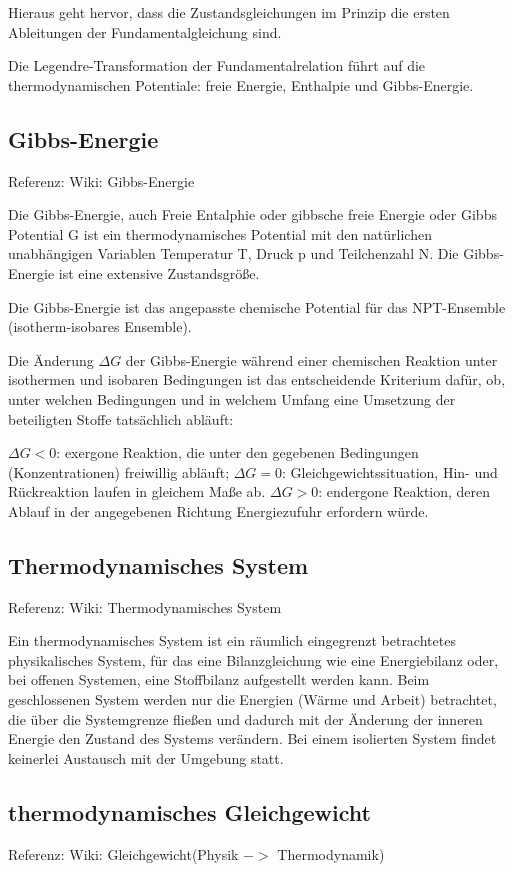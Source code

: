 \documentclass[]{article}
\begin{document}
Hieraus geht hervor, dass die Zustandsgleichungen im Prinzip die ersten Ableitungen der Fundamentalgleichung sind.

Die Legendre-Transformation der Fundamentalrelation führt auf die thermodynamischen Potentiale: freie Energie, Enthalpie und Gibbs-Energie.

\subsection{Gibbs-Energie}
Referenz: Wiki: Gibbs-Energie

Die Gibbs-Energie, auch Freie Entalphie oder gibbsche freie Energie oder Gibbs Potential G ist ein thermodynamisches Potential mit den natürlichen unabhängigen Variablen Temperatur T, Druck p und Teilchenzahl N.  Die Gibbs-Energie ist eine extensive Zustandsgröße.

Die Gibbs-Energie ist das angepasste chemische Potential für das NPT-Ensemble (isotherm-isobares Ensemble).

Die Änderung $\Delta G$ der Gibbs-Energie während einer chemischen Reaktion unter isothermen und isobaren Bedingungen ist das entscheidende Kriterium dafür, ob, unter welchen Bedingungen und in welchem Umfang eine Umsetzung der beteiligten Stoffe tatsächlich abläuft:

    $\Delta G<0$: exergone Reaktion, die unter den gegebenen Bedingungen (Konzentrationen) freiwillig abläuft;
    $\Delta G=0$: Gleichgewichtssituation, Hin- und Rückreaktion laufen in gleichem Maße ab.
    $\Delta G>0$: endergone Reaktion, deren Ablauf in der angegebenen Richtung Energiezufuhr erfordern würde.


\subsection{Thermodynamisches System}
Referenz: Wiki: Thermodynamisches System

Ein thermodynamisches System ist ein räumlich eingegrenzt betrachtetes physikalisches System, für das eine Bilanzgleichung wie eine Energiebilanz oder, bei offenen Systemen, eine Stoffbilanz aufgestellt werden kann. Beim geschlossenen System werden nur die Energien (Wärme und Arbeit) betrachtet, die über die Systemgrenze fließen und dadurch mit der Änderung der inneren Energie den Zustand des Systems verändern. Bei einem isolierten System findet keinerlei Austausch mit der Umgebung statt.


\subsection{thermodynamisches Gleichgewicht}
Referenz: Wiki: Gleichgewicht(Physik $->$ Thermodynamik) 
\end{document}

